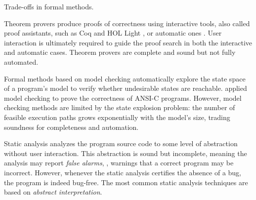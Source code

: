 \begin{marginfigure}
  \caption{Trade-offs in formal methods.}
\end{marginfigure}

Theorem provers  produce proofs of correctness using interactive tools, also called proof assistants, such as Coq  and HOL Light , or automatic ones .
User interaction is ultimately required to guide the proof search in both the interactive and automatic cases.
Theorem provers are complete and sound but not fully automated.

Formal methods based on model checking automatically explore the state space of a program's model to verify whether undesirable states are reachable.
 applied model checking to prove the correctness of ANSI-C programs.
However, model checking methods are limited by the state explosion problem: the number of feasible execution paths grows exponentially with the model's size, trading soundness for completeness and automation.

Static analysis analyzes the program source code to some level of abstraction without user interaction.
This abstraction is sound but incomplete, meaning the analysis may report \emph{false alarms}, \ie, warnings that a correct program may be incorrect.
However, whenever the static analysis certifies the absence of a bug, the program is indeed bug-free.
The most common static analysis techniques are based on \emph{abstract interpretation}.

